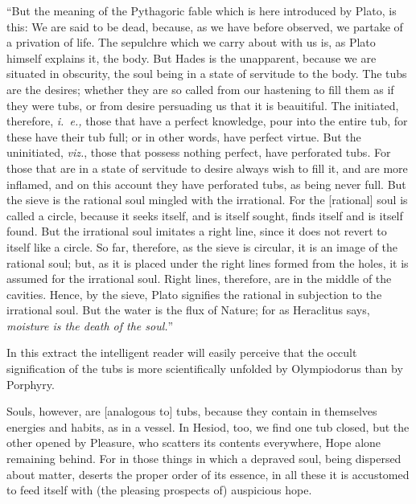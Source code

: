 \documentclass[12pt]{article}
\begin{document}
{``But the meaning of the Pythagoric fable which is here introduced by Plato, is
this: We are said to be dead, because, as we have before observed, we partake
of a privation of life. The sepulchre which we carry about with us is, as Plato
himself explains it, the body. But Hades is the unapparent, because we are
situated in obscurity, the soul being in a state of servitude to the body. The
tubs are the desires; whether they are so called from our hastening to fill
them as if they were tubs, or from desire persuading us that it is beauitiful.
The initiated, therefore, \textit{i.~e.,} those that have a perfect knowledge,
pour into the entire tub, for these have their tub full; or in other words,
have perfect virtue. But the uninitiated, \textit{viz.}, those that possess
nothing perfect, have perforated tubs. For those that are in a state of
servitude to desire always wish to fill it, and are more inflamed, and on this
account they have perforated tubs, as being never full. But the sieve is the
rational soul mingled with the irrational. For the [rational] soul is called a
circle, because it seeks itself, and is itself sought, finds itself and is
itself found. But the irrational soul imitates a right line, since it does not
revert to itself like a circle. So far, therefore, as the sieve is circular, it
is an image of the rational soul; but, as it is placed under the right lines
formed from the holes, it is assumed for the irrational soul. Right lines,
therefore, are in the middle of the cavities. Hence, by the sieve, Plato
signifies the rational in subjection to the irrational soul. But the water is
the flux of Nature; for as Heraclitus says, \textit{moisture is the death of
the soul.}''

In this extract the intelligent reader will easily perceive that the occult
signification of the tubs is more scientifically unfolded by Olympiodorus than
by Porphyry.} Souls, however, are [analogous to] tubs, because they contain in
themselves energies and habits, as in a vessel. In Hesiod, too, we find one tub
closed, but the other opened by Pleasure, who scatters its contents everywhere,
Hope alone remaining behind. For in those things in which a depraved soul,
being dispersed about matter, deserts the proper order of its essence, in all
these it is accustomed to feed itself with (the pleasing prospects of)
auspicious hope.
\end{document}

